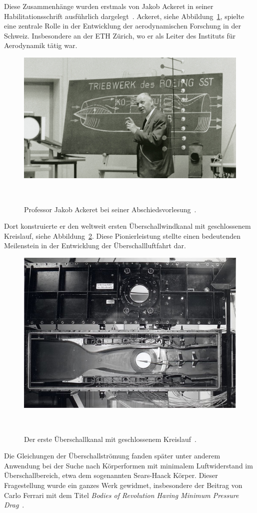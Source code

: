 Diese Zusammenhänge wurden erstmals von Jakob Ackeret in 
seiner Habilitationsschrift ausführlich 
dargelegt~\cite{Ackeret1928}.
Ackeret, siehe Abbildung~\ref{fig:ackeret}, 
spielte eine zentrale Rolle in der Entwicklung 
der aerodynamischen Forschung in der Schweiz. 
Insbesondere an der ETH Zürich, wo er als Leiter 
des Instituts für Aerodynamik tätig war.
\begin{figure}
    \centering
    \includegraphics[width=\textwidth]{papers/ueberschall/figures/Jakob_Ackeret_1967.jpg}
    \caption{Professor Jakob Ackeret bei seiner Abschiedsvorlesung~\cite{AckeretFoto1967}.}
    ~\label{fig:ackeret}
\end{figure}
Dort konstruierte er den weltweit ersten 
Überschallwindkanal mit geschlossenem Kreislauf, 
siehe Abbildung~\ref{fig:windkanal}.
Diese Pionierleistung stellte einen bedeutenden 
Meilenstein in der Entwicklung der Überschallluftfahrt dar.
\begin{figure}
    \centering
    \includegraphics[width=\textwidth]{papers/ueberschall/figures/Windkanal.jpg}
    \caption{Der erste Überschallkanal mit geschlossenem Kreislauf~\cite{ETHeritage2020}.}
    ~\label{fig:windkanal}
\end{figure}

Die Gleichungen der Überschallströmung fanden später 
unter anderem Anwendung bei der Suche nach Körperformen 
mit minimalem Luftwiderstand im Überschallbereich, 
etwa dem sogenannten Sears-Haack Körper.
Dieser Fragestellung wurde ein ganzes Werk gewidmet,
insbesondere der Beitrag von Carlo Ferrari mit dem Titel 
\textit{Bodies of Revolution Having Minimum Pressure Drag}~\cite{Ferrari1965}.

